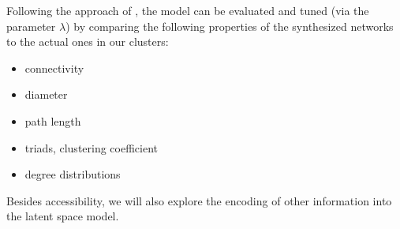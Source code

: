 \documentclass[11pt,twoside]{article}
\numberwithin{equation}{section}
\newcommand{\?}{\stackrel{?}{=}}
\begin{document}
Following the approach of \cite{zhou2015generating}, the model can be evaluated and tuned (via the parameter $\lambda$) by comparing the following properties of the synthesized networks to the actual ones in our clusters:
\begin{itemize}
\item connectivity
\item diameter
\item path length
\item triads, clustering coefficient
\item degree distributions
\end{itemize}

Besides accessibility, we will also explore the encoding of other information into the latent space model.






\printbibliography
\end{document}
